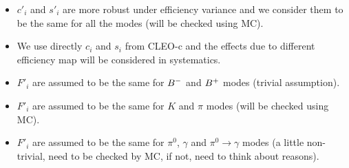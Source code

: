 \begin{itemize}
\item $c'_i$ and $s'_i$ are more robust under efficiency variance and we consider them to be the same for all the modes (will be checked using MC).
\item We use directly $c_i$ and $s_i$ from CLEO-c and the effects due to different efficiency map will be considered in systematics.
\item $F'_i$ are assumed to be the same for ${{{B}^-}}$ and ${{{B}^+}}$ modes (trivial assumption). 
\item $F'_i$ are assumed to be the same for $K$ and $\pi$ modes (will be checked using MC). 
\item $F'_i$ are assumed to be the same for $\pi^0$, $\gamma$ and $\pi^0 \to \gamma$ modes (a little non-trivial, need to be checked by MC, if not, need to think about reasons).
\end{itemize}


